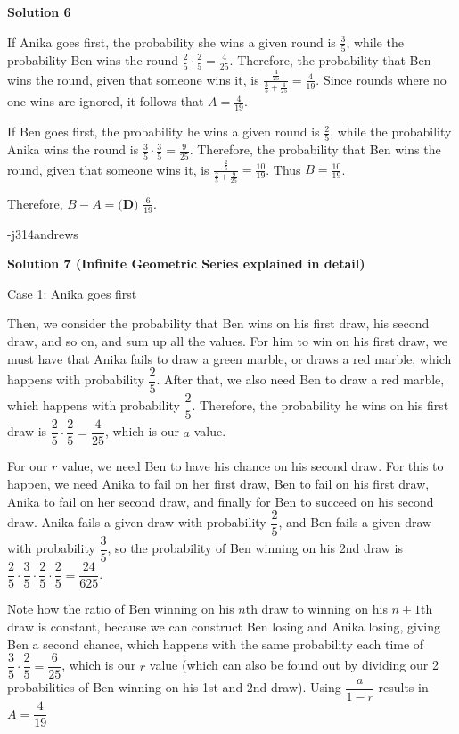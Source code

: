 \begin{enumerate}
 



\textbf{Solution 6}

If Anika goes first, the probability she wins a given round is $\frac{3}{5}$, while the probability Ben wins the round $\frac{2}{5}\cdot\frac{2}{5}=\frac{4}{25}$.  Therefore, the probability that Ben wins the round, given that someone wins it, is $\frac{\frac{4}{25}}{\frac{3}{5}+\frac{4}{25}} = \frac{4}{19}$.  Since rounds where no one wins are ignored, it follows that $A = \frac{4}{19}$.  

 If Ben goes first, the probability he wins a given round is $\frac{2}{5}$, while the probability Anika wins the round is $\frac{3}{5}\cdot\frac{3}{5}=\frac{9}{25}$.  Therefore, the probability that Ben wins the round, given that someone wins it, is $\frac{\frac{2}{5}}{\frac{2}{5}+\frac{9}{25}} = \frac{10}{19}$.  Thus $B = \frac{10}{19}$.

 Therefore, $B-A = \boxed{\textbf{(D) } \frac{6}{19}}$.

 -j314andrews

 



\textbf{Solution 7 (Infinite Geometric Series explained in detail)}

Case 1: Anika goes first 

 Then, we consider the probability that Ben wins on his first draw, his second draw, and so on, and sum up all the values. For him to win on his first draw, we must have that Anika fails to draw a green marble, or draws a red marble, which happens with probability $\dfrac{2}{5}$. After that, we also need Ben to draw a red marble, which happens with probability $\dfrac{2}{5}$. Therefore, the probability he wins on his first draw is $\dfrac{2}{5} \cdot \dfrac{2}{5} = \dfrac{4}{25}$, which is our $a$ value.  

 
For our $r$ value, we need Ben to have his chance on his second draw. For this to happen, we need Anika to fail on her first draw, Ben to fail on his first draw, Anika to fail on her second draw, and finally for Ben to succeed on his second draw. Anika fails a given draw with probability $\dfrac{2}{5}$, and Ben fails a given draw with probability $\dfrac{3}{5}$, so the probability of Ben winning on his 2nd draw is $\dfrac{2}{5} \cdot \dfrac{3}{5} \cdot \dfrac{2}{5} \cdot \dfrac{2}{5} = \dfrac{24}{625}$. 

 
Note how the ratio of Ben winning on his $n$th draw to winning on his $n + 1$th draw is constant, because we can construct Ben losing and Anika losing, giving Ben a second chance, which happens with the same probability each time of $\dfrac{3}{5} \cdot \dfrac{2}{5} = \dfrac{6}{25}$, which is our $r$ value (which can also be found out by dividing our 2 probabilities of Ben winning on his 1st and 2nd draw). Using $\dfrac{a}{1 - r}$ results in $A = \dfrac{4}{19}$


\end{enumerate}
